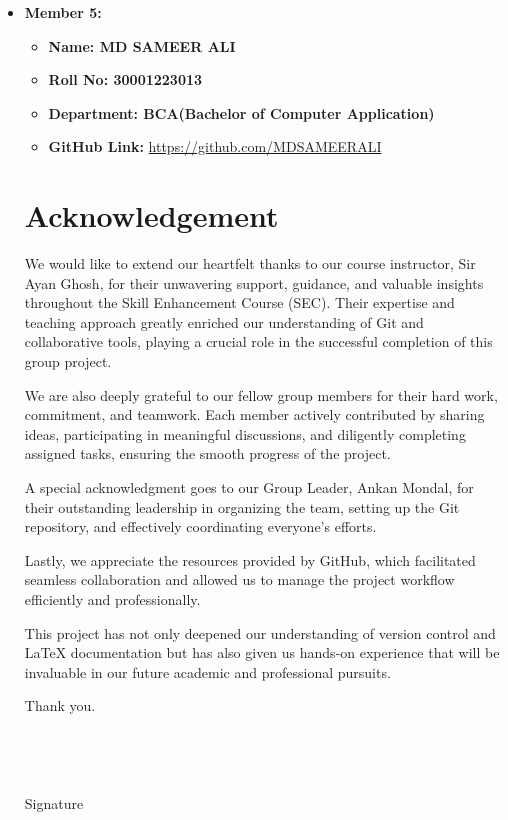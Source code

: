 \documentclass[a4paper,15pt]{article}
\begin{document}
\begin{itemize}[leftmargin=1.5cm]
    \item \textbf{Member 5:} 
    \begin{itemize}[leftmargin=1.5cm]
        \item \textbf{Name: MD SAMEER ALI } 
        \item \textbf{Roll No: 30001223013 } 
        \item \textbf{Department: BCA(Bachelor of Computer Application) } 
        \item \textbf{GitHub Link:} \url{https://github.com/MDSAMEERALI}
\end{itemize}
\newpage

\section*{Acknowledgement} 

 \large We would like to extend our heartfelt thanks to our course instructor, Sir Ayan Ghosh, for their unwavering support, guidance, and valuable insights throughout the Skill Enhancement Course (SEC). Their expertise and teaching approach greatly enriched our understanding of Git and collaborative tools, playing a crucial role in the successful completion of this group project.

We are also deeply grateful to our fellow group members for their hard work, commitment, and teamwork. Each member actively contributed by sharing ideas, participating in meaningful discussions, and diligently completing assigned tasks, ensuring the smooth progress of the project.

A special acknowledgment goes to our Group Leader, Ankan Mondal, for their outstanding leadership in organizing the team, setting up the Git repository, and effectively coordinating everyone's efforts.

Lastly, we appreciate the resources provided by GitHub, which facilitated seamless collaboration and allowed us to manage the project workflow efficiently and professionally.

This project has not only deepened our understanding of version control and LaTeX documentation but has also given us hands-on experience that will be invaluable in our future academic and professional pursuits.

Thank you.\\ \\ \\ \\ \\
Signature
\newpage 


\end{itemize}
\end{document}
